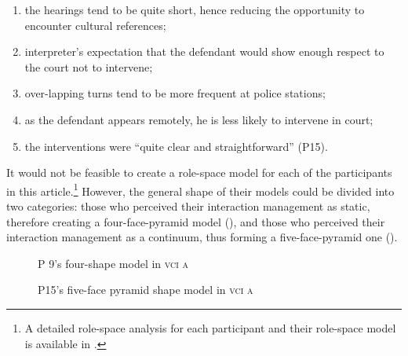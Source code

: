 \documentclass[output=paper]{langsci/langscibook}
\begin{document}
\begin{enumerate}
\item the hearings tend to be quite short, hence reducing the opportunity to encounter cultural references; 
\item interpreter’s expectation that the defendant would show enough respect to the court not to intervene; 
\item over-lapping turns tend to be more frequent at police stations; 
\item as the defendant appears remotely, he is less likely to intervene in court; 
\item the interventions were “quite clear and straightforward” (P15).
\end{enumerate}

It would not be feasible to create a role-space model for each of the participants in this article.\footnote{A detailed role-space analysis for each participant and their role-space model is available in \citet{Devaux2017b}.} However, the general shape of their models could be divided into two categories: those who perceived their interaction management as static, therefore creating a four-face-pyramid model (), and those who perceived their interaction management as a continuum, thus forming a five-face-pyramid one ().  
 

\begin{figure}
\caption{P 9's four-shape model in \textsc{vci a}\label{fig:devaux:3}}
\end{figure}

\begin{figure}
\caption{P15's five-face pyramid shape model in \textsc{vci a}\label{fig:devaux:4}}
\end{figure}
\end{document}
